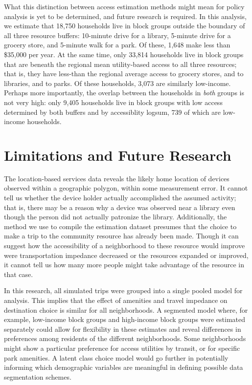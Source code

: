 \documentclass[3p, authoryear, review]{elsarticle} %
\begin{document}
What this distinction between access estimation methods might mean for policy
analysis is yet to be determined, and future research is required. In this analysis,
we estimate that 18,750 households live in block groups outside the
boundary of all three resource buffers: 10-minute drive for a library, 5-minute drive for
a grocery store, and 5-minute walk for a park. Of these, 1,648 make less
than \$35,000 per year.
At the same time, only 33,814 households
live in block groups that are beneath the regional mean utility-based access to
all three resources; that is, they have less-than the regional average access to
grocery stores, and to libraries, and to parks. Of these households, 3,073
are similarly low-income. Perhaps more importantly, the overlap between the households
in \emph{both} groups is not very high: only 9,405 households live
in block groups with low access determined by both buffers and by accessiblity
logsum, 739 of which are low-income households.

\hypertarget{limitations-and-future-research}{%
\section{Limitations and Future Research}\label{limitations-and-future-research}}

The location-based services data reveals the likely home location of devices
observed within a geographic polygon, within some measurement error.
It cannot tell us whether the device holder actually accomplished the assumed
activity; that is, there may be a reason why a device was observed near a
library even though the person did not actually patronize the library.
Additionally, the method we use to compile the estimation dataset presumes that
the choice to make a trip to the community resource has already been made. Though
it can suggest how the accessibility of a neighborhood to these resource would improve
were transportation impedance decreased or the resources expanded or improved,
it cannot tell us how many more people might take advantage of the resource
in that case.

In this research, all simulated trips were grouped into a single pooled model
for analysis. This implies that the effect of amenities and travel impedance on
destination choice is similar for all neighborhoods. A segmented model
where, for example, low-income block groups and high-income block groups were
estimated separately could allow for flexibility in these estimates and reveal
differences in preferences among residents of the different neighborhoods. Some
neighborhoods might show a particular preference for access utilities by
transit, or for specific park amenities. A latent class choice model \citep{walker2002}
would go further in potentially informing which demographic variables are
meaningful in defining possible data segmentation schemes.
\end{document}
